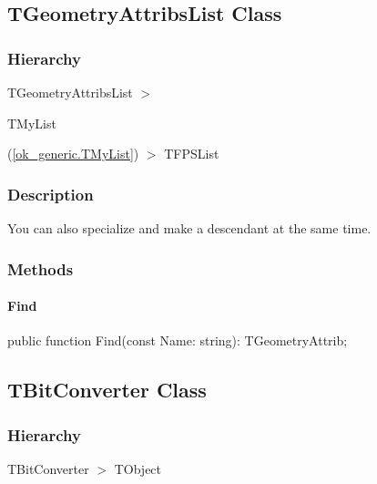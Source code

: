 \documentclass{report}
\begin{document}
\subsection*{TGeometryAttribsList Class}
\subsubsection*{\large{\textbf{Hierarchy}}\normalsize\hspace{1ex}\hfill}
TGeometryAttribsList {$>$} \begin{ttfamily}TMyList\end{ttfamily}(\ref{ok_generic.TMyList}) {$>$} 
TFPSList
\subsubsection*{\large{\textbf{Description}}\normalsize\hspace{1ex}\hfill}
You can also specialize and make a descendant at the same time.\subsubsection*{\large{\textbf{Methods}}\normalsize\hspace{1ex}\hfill}
\paragraph*{Find}\hspace*{\fill}

\begin{list}{}{
\setlength{\itemindent}{0cm}
\setlength{\listparindent}{0cm}
\setlength{\leftmargin}{\evensidemargin}
\addtolength{\leftmargin}{\tmplength}
\settowidth{\labelsep}{X}
\addtolength{\leftmargin}{\labelsep}
\setlength{\labelwidth}{\tmplength}
}
\begin{flushleft}
\item[\textbf{Declaration}\hfill]
\begin{ttfamily}
public function Find(const Name: string): TGeometryAttrib;\end{ttfamily}


\end{flushleft}
\end{list}
\subsection*{TBitConverter Class}
\subsubsection*{\large{\textbf{Hierarchy}}\normalsize\hspace{1ex}\hfill}
TBitConverter {$>$} TObject
\end{document}
